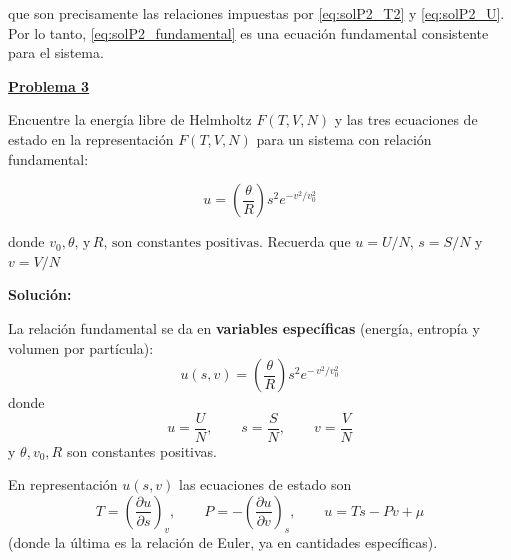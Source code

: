 \documentclass{article}
\newenvironment{AGbox}[1][7]%
{%
  \begin{tcolorbox}[
    enhanced, breakable,
    colframe=AppleGreen,
    colback=AppleGreen!#1,
    boxrule=1pt,
    borderline west={2mm}{-10mm}{AppleGreen},
    sharp corners=southwest,
    left=14pt,right=14pt,top=10pt,bottom=10pt,
     boxsep=6pt,
  ]%
}{%
  \end{tcolorbox}%
}
\begin{document}
que son precisamente las relaciones impuestas por
\eqref{eq:solP2_T2} y \eqref{eq:solP2_U}.  
Por lo tanto, \eqref{eq:solP2_fundamental} es una ecuación fundamental
consistente para el sistema.



\begin{AGbox}[8]
\textcolor{Apple Green}{\textbf{\underline{Problema 3}}} \vspace{2mm}

Encuentre la energía libre de Helmholtz \(F(T,V,N)\) y las tres ecuaciones de estado en la representación  
\(F(T,V,N)\) para un sistema con relación fundamental:

\begin{equation}
u = \left(  \frac{ \theta }{R}  \right)s^{2}e^{-v^{2}/v_{0}^{2}}
\label{eq:P3_relacion_fundamental}
\end{equation}

donde \( v_{0}, \theta, \, \text{y}\, R, \, \text{son constantes positivas.}\) Recuerda que $u=U/N$, $s=S/N$ y $v=V/N$

\end{AGbox}
\vspace{0.5cm}

\textcolor{Tuscany}{\textbf{Solución:}}

La relación fundamental se da en \textcolor{Tarawera}{\textbf{variables específicas}}  
(energía, entropía y volumen por partícula):
\begin{equation}
u(s,v)
= \left(\frac{\theta}{R}\right) s^{2}
  e^{-\,v^{2}/v_{0}^{2}}
\label{eq:solP3_u_sv}
\end{equation}
donde
\[
u = \frac{U}{N}, \qquad
s = \frac{S}{N}, \qquad
v = \frac{V}{N}
\]
y \(\theta, v_{0}, R\) son constantes positivas.

\vspace{0.3cm}

En representación \(u(s,v)\) las ecuaciones de estado son
\[
T = \left(\frac{\partial u}{\partial s}\right)_{v},
\qquad
P = -\left(\frac{\partial u}{\partial v}\right)_{s},
\qquad
u = T s - P v + \mu
\]
(donde la última es la relación de Euler, ya en cantidades específicas).
\end{document}
